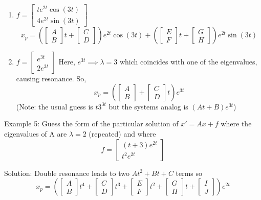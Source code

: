 \documentclass[12pt]{article}
\begin{document}
\begin{enumerate}
    \item $f  =\begin{bmatrix}
        te^{2t} \cos(3t)\\
        4e^{2t} \sin (3t)
    \end{bmatrix}$
    \[\boxed{x_p = \left(\begin{bmatrix}
        A\\B
    \end{bmatrix}t + \begin{bmatrix}
        C\\D
    \end{bmatrix}\right)e^{2t}\cos(3t) + \left(\begin{bmatrix}
        E\\F
    \end{bmatrix}t + \begin{bmatrix}
        G\\H
    \end{bmatrix}\right)e^{2t} \sin(3t)}\]

    \item $f = \begin{bmatrix}
        e^{3t}\\
        2e^{3t}
    \end{bmatrix}$
    Here, $e^{3t} \implies \lambda = 3$ which coincides with one of the eigenvalues, causing resonance. So,
    \[\boxed{x_p = \left(\begin{bmatrix}
        A\\B
    \end{bmatrix} + \begin{bmatrix}
        C\\D
    \end{bmatrix}t \right) e^{3t}}\]
    (Note: the usual guess is $t3^{3t}$ but the systems analog is $(At +B)e^{3t}$)
\end{enumerate}

Example 5: Guess the form of the particular solution of $x' = Ax + f$ where the eigenvalues of A are $\lambda = 2$ (repeated) and where
\[f = \begin{bmatrix}
    (t+3)e^{2t}\\
    t^2 e^{2t}
\end{bmatrix}\]

Solution:
Double resonance leads to two $At^2 + Bt + C$ terms so 
\[\boxed{x_p = \left(\begin{bmatrix}
    A\\B
\end{bmatrix} t^4 + \begin{bmatrix}
    C\\D
\end{bmatrix}t^3 + \begin{bmatrix}
    E\\F
\end{bmatrix} t^2 + \begin{bmatrix}
    G\\H
\end{bmatrix} t + \begin{bmatrix}
    I\\J
\end{bmatrix}\right)e^{2t}}\]
\end{document}

